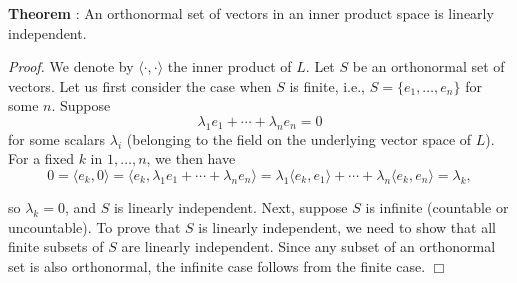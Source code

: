 \documentclass[12pt]{article}
\begin{document}
{\bf Theorem }: An orthonormal set of vectors in an inner product space is linearly independent.

\emph{Proof.} We denote by $\langle \cdot, \cdot \rangle$ the inner product of $L$.  Let $S$ be an orthonormal set of vectors.
Let us first consider the case when $S$ is finite, i.e.,
$S=\{e_1,\ldots, e_n\}$ for some $n$.
Suppose
$$ \lambda_1 e_1 + \cdots + \lambda_n e_n =0$$
for some scalars $\lambda_i$ (belonging to the field on the
underlying vector space of $L$). For a fixed $k$ in $1,\ldots, n$,
we then have
$$0=\langle e_k,0\rangle =  \langle e_k,\lambda_1 e_1 + \cdots + \lambda_n e_n \rangle = \lambda_1 \langle e_k,e_1\rangle + \cdots + \lambda_n \langle e_k,e_n\rangle = \lambda_k,$$

so $\lambda_k=0$, and $S$ is linearly independent.
Next, suppose $S$ is infinite (countable or uncountable). To prove
that $S$ is linearly independent, we need to show that
all finite subsets of $S$ are linearly independent. Since any
subset of an orthonormal set is also orthonormal, the infinite case
follows from the finite case. $\Box$
\end{document}
